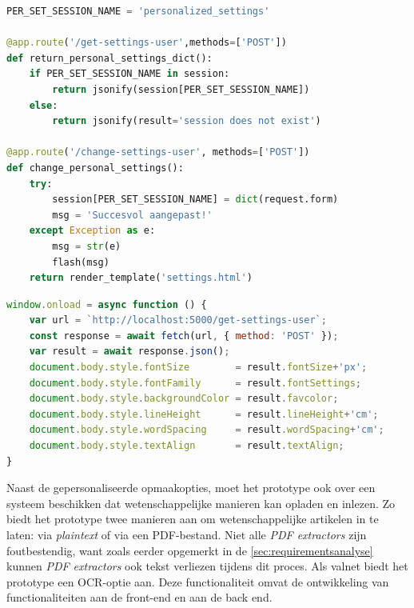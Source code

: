 \begin{lstlisting}[language=python, caption={De back end functie die de aanpassingen uit het formulier opslaat als sessievariabele.}, label={code:back-end-session-personalized}]
PER_SET_SESSION_NAME = 'personalized_settings'

@app.route('/get-settings-user',methods=['POST'])
def return_personal_settings_dict():
	if PER_SET_SESSION_NAME in session:
		return jsonify(session[PER_SET_SESSION_NAME])
	else:
		return jsonify(result='session does not exist')
	
@app.route('/change-settings-user', methods=['POST'])
def change_personal_settings():
	try:
		session[PER_SET_SESSION_NAME] = dict(request.form)
		msg = 'Succesvol aangepast!'
	except Exception as e:
		msg = str(e)
		flash(msg)
	return render_template('settings.html')
\end{lstlisting}

\begin{lstlisting}[language=javascript, caption={De onload-functie die de gepersonaliseerde opmaakopties regelt bij het inladen van een webpagina.}, label={code:window-onload-js}]
window.onload = async function () {
	var url = `http://localhost:5000/get-settings-user`;
	const response = await fetch(url, { method: 'POST' });
	var result = await response.json();
	document.body.style.fontSize        = result.fontSize+'px';
	document.body.style.fontFamily      = result.fontSettings;
	document.body.style.backgroundColor = result.favcolor;
	document.body.style.lineHeight      = result.lineHeight+'cm';
	document.body.style.wordSpacing     = result.wordSpacing+'cm';
	document.body.style.textAlign       = result.textAlign;
}
\end{lstlisting}

Naast de gepersonaliseerde opmaakopties, moet het prototype ook over een systeem beschikken dat wetenschappelijke manieren kan opladen en inlezen. Zo biedt het prototype twee manieren aan om wetenschappelijke artikelen in te laten: via \textit{plaintext} of via een PDF-bestand. Niet alle \textit{PDF extractors} zijn foutbestendig, want zoals eerder opgemerkt in de \ref{sec:requirementsanalyse} kunnen \textit{PDF extractors} ook tekst verliezen tijdens dit proces. Als valnet biedt het prototype een OCR-optie aan. Deze functionaliteit omvat de ontwikkeling van functionaliteiten aan de front-end en aan de back end.

\medspace

